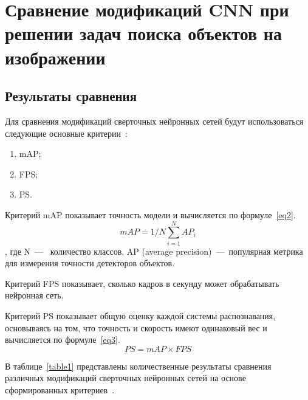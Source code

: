 \chapter{Сравнение модификаций CNN при решении задач поиска объектов на изображении}

\section{Результаты сравнения}

Для сравнения модификаций сверточных нейронных сетей будут использоваться следующие основные критерии~\cite{base, all, yolobase, cmp}:
\begin{enumerate}
	\item mAP;
	\item FPS;
	\item PS.
\end{enumerate}

Критерий mAP показывает точность модели и вычисляется по формуле~\ref{eq2}.
\begin{equation}
	\label{eq2}
	mAP = 1/N \sum_{i=1}^{N} AP_{i}
\end{equation}
, где N~---~ количество классов,
AP (average precision)~---~популярная метрика для измерения точности детекторов объектов.

Критерий FPS показывает, сколько кадров в секунду может обрабатывать нейронная сеть.

Критерий PS показывает общую оценку каждой системы распознавания, основываясь на том, что точность и скорость имеют одинаковый вес и вычисляется по формуле~\ref{eq3}.
\begin{equation}
	\label{eq3}
	PS = mAP \times FPS
\end{equation}

В таблице~\ref{table1} представлены количественные результаты сравнения различных модификаций сверточных нейронных сетей на основе сформированных критериев~\cite{all, yolobase}.

